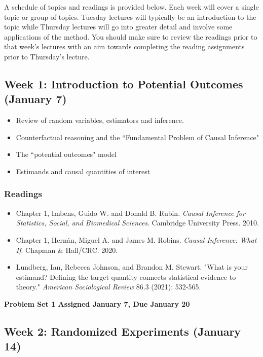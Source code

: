 \documentclass[11pt, article, oneside]{memoir}
\theoremstyle{Assumption}
\begin{document}
A schedule of topics and readings is provided below. Each week will cover a single topic or group of topics. Tuesday lectures will typically be an introduction to the topic while Thursday lectures will go into greater detail and involve some applications of the method. You should make sure to review the readings prior to that week's lectures with an aim towards completing the reading assignments prior to Thursday's lecture.

\subsection{Week 1: Introduction to Potential Outcomes (January 7)}

\begin{itemize}
  \item Review of random variables, estimators and inference.
  \item Counterfactual reasoning and the ``Fundamental Problem of Causal Inference"
  \item The ``potential outcomes" model
  \item Estimands and causal quantities of interest
\end{itemize}

\subsubsection*{Readings}

\begin{itemize}
\item Chapter 1, Imbens, Guido W. and Donald B. Rubin. \emph{Causal Inference for Statistics, Social, and Biomedical Sciences}. Cambridge University Press.  2010.
\item Chapter 1, Hern\'an, Miguel A. and  James M. Robins. \emph{Causal Inference: What If}.  Chapman \& Hall/CRC. 2020.
\item Lundberg, Ian, Rebecca Johnson, and Brandon M. Stewart. "What is your estimand? Defining the target quantity connects statistical evidence to theory." \textit{American Sociological Review} 86.3 (2021): 532-565.
\end{itemize}

\textbf{Problem Set 1 Assigned January 7, Due January 20}

\subsection{Week 2: Randomized Experiments (January 14)}
\end{document}
